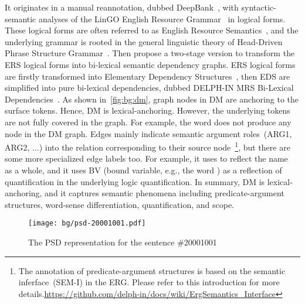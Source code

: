 It originates in a manual reannotation, dubbed
DeepBank~\citep{Fli:Kor:Zha:12}, with syntactic-semantic analyses of
the LinGO English Resource Grammar~\citep{Oep:Fli:Tou:04} in logical
forms. These logical forms are often referred to as English Resource
Semantics~\citep[ERS,][]{Ben:Fli:Oep:15}, and the underlying grammar
is rooted in the general linguistic theory of Head-Driven Phrase
Structure Grammar~\citep[HPSG,][]{Pol:Sag:94}. Then
\citet{Iva:Oep:Ovr:12} propose a two-stage version to transform the
ERS logical forms into bi-lexical semantic dependency graphs. ERS
logical forms are firstly transformed into Elementary Dependency
Structures~\citep[EDS,][]{Oep:Lon:06}, then EDS are simplified into
pure bi-lexical dependencies, dubbed DELPH-IN MRS Bi-Lexical
Dependencies~\citep[DM,][]{Iva:Oep:Ovr:12}. As shown
in~\autoref{fig:bg:dm}, graph nodes in DM are anchoring to the surface
tokens. Hence, DM is lexical-anchoring. However, the underlying tokens
are not fully covered in the graph. For example, the word
 does not produce any node in the DM graph. Edges mainly
indicate semantic argument roles~(ARG1, ARG2, ...) into the relation
corresponding to their source node~\footnote{The annotation of
  predicate-argument structures is based on the semantic
  inferface~(SEM-I) in the ERG. Please refer to this introduction for
  more
  details.\url{https://github.com/delph-in/docs/wiki/ErgSemantics_Interface}},
but there are some more specialized edge labels too. For example, it
uses  to reflect the name~ as a
whole, and it uses BV (bound variable, e.g., the word ) as
a reflection of quantification in the underlying logic
quantification. In summary, DM is lexical-anchoring, and it captures
semantic phenomena including predicate-argument structures, word-sense
differentiation, quantification, and scope.

\begin{figure}[!th]
\centering
\texttt{[image: bg/psd-20001001.pdf]}
\caption{\label{fig:bg:psd}The PSD representation for the sentence
  \#20001001}
\end{figure}

